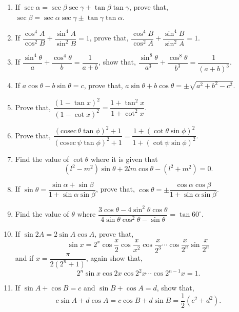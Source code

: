 \documentclass[11pt, a4paper]{article}
\begin{document}
\begin{enumerate}
	\item If $\sec \alpha = \sec \beta \sec \gamma + \tan \beta \tan \gamma$, prove that, $\sec \beta = \sec \alpha \sec \gamma \pm \tan \gamma \tan \alpha $.
	
	\item If $\dfrac{\cos^4 A}{\cos^2 B} + \dfrac{\sin^4 A}{\sin^2 B} = 1$, prove that, $\dfrac{\cos^4 B}{\cos^2 A} + \dfrac{\sin^4 B}{\sin^2 A} = 1$.
	
	\item If $\dfrac{\sin^4 \theta}{a} + \dfrac{\cos^4 \theta}{b} = \dfrac{1}{a+b}$, show that, $\dfrac{\sin^8 \theta}{a^3} + \dfrac{\cos^8 \theta}{b^3} = \dfrac{1}{(a+b)^3}$.
	
	\item If $a\cos \theta - b \sin \theta = c$, prove that, $a\sin \theta + b \cos \theta = \pm \sqrt{a^2 + b^2 - c^2}$.
	
	\item Prove that, $\dfrac{(1 - \tan x)^2}{(1 - \cot x)^2} = \dfrac{1 + \tan^2 x}{1 + \cot^2 x}$.
	
	\item Prove that, $\dfrac{(\mathrm{cosec\,} \theta \tan \phi)^2 + 1}{(\mathrm{cosec\,} \psi \tan \phi)^2 + 1} = \dfrac{1 + (\cot \theta \sin \phi)^2}{1 + (\cot \psi \sin \phi)^2}$.
	
	\item Find the value of $\cot \theta$ where it is given that $$(l^2 - m^2) \sin \theta + 2lm\cos \theta - (l^2 + m^2) = 0.$$
	
	\item If $\sin \theta = \dfrac{\sin \alpha + \sin \beta}{1 + \sin \alpha \sin \beta}$, prove that, $\cos \theta = \pm \dfrac{\cos \alpha \cos \beta}{1 + \sin \alpha \sin \beta}.$
	
	
	\item Find the value of $\theta$ where $\dfrac{3\cos \theta - 4 \sin^2 \theta \cos \theta}{4\sin \theta \cos^2 \theta - \sin \theta} = \tan 60^{\circ}.$
	
	\item If $\sin 2A = 2 \sin A \cos A$, prove that, $$\sin x = 2^x \cos \dfrac{x}{2} \cos \dfrac{x}{x^2} \cos \dfrac{x}{2^3} \cdots \cos \dfrac{x}{2^n} \sin \dfrac{x}{2^n}$$ and if $x = \dfrac{\pi}{2(2^n + 1)}$, again show that, $$2^n \sin x \cos 2x \cos 2^2x \cdots \cos 2^{n-1}x = 1.$$
	
	\item If $\sin A + \cos B = c$ and $\sin B + \cos A = d$, show that, $$c \sin A + d \cos A = c \cos B + d \sin B = \dfrac{1}{2}(c^2 + d^2).$$
	

\end{enumerate}
\end{document}
